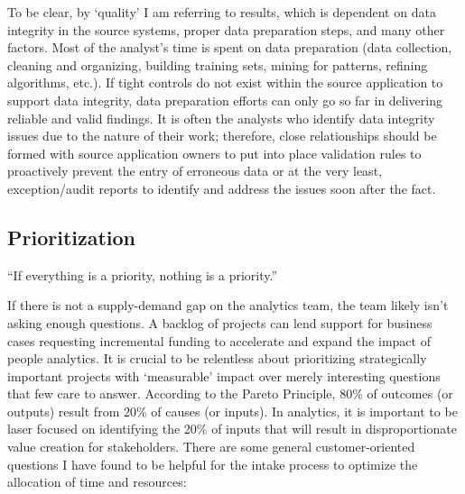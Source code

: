 \documentclass[]{book}
\begin{document}
To be clear, by `quality' I am referring to results, which is dependent on data integrity in the source systems, proper data preparation steps, and many other factors. Most of the analyst's time is spent on data preparation (data collection, cleaning and organizing, building training sets, mining for patterns, refining algorithms, etc.). If tight controls do not exist within the source application to support data integrity, data preparation efforts can only go so far in delivering reliable and valid findings. It is often the analysts who identify data integrity issues due to the nature of their work; therefore, close relationships should be formed with source application owners to put into place validation rules to proactively prevent the entry of erroneous data or at the very least, exception/audit reports to identify and address the issues soon after the fact.

\hypertarget{prioritization}{%
\subsection{Prioritization}\label{prioritization}}

``If everything is a priority, nothing is a priority.''

If there is not a supply-demand gap on the analytics team, the team likely isn't asking enough questions. A backlog of projects can lend support for business cases requesting incremental funding to accelerate and expand the impact of people analytics. It is crucial to be relentless about prioritizing strategically important projects with `measurable' impact over merely interesting questions that few care to answer. According to the Pareto Principle, 80\% of outcomes (or outputs) result from 20\% of causes (or inputs). In analytics, it is important to be laser focused on identifying the 20\% of inputs that will result in disproportionate value creation for stakeholders. There are some general customer-oriented questions I have found to be helpful for the intake process to optimize the allocation of time and resources:
\end{document}
